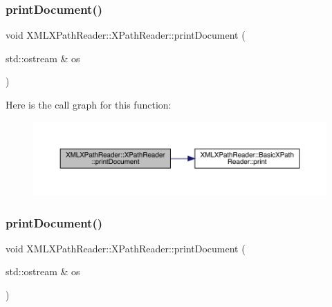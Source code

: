 \subsubsection{\texorpdfstring{printDocument()}{printDocument()}\hspace{0.1cm}{\footnotesize\ttfamily [1/2]}}
{\footnotesize\ttfamily void X\+M\+L\+X\+Path\+Reader\+::\+X\+Path\+Reader\+::print\+Document (\begin{DoxyParamCaption}\item[{std\+::ostream \&}]{os }\end{DoxyParamCaption})\hspace{0.3cm}{\ttfamily [inline]}}

Here is the call graph for this function\+:
\nopagebreak
\begin{figure}[H]
\begin{center}
\leavevmode
\includegraphics[width=350pt]{d3/d5a/classXMLXPathReader_1_1XPathReader_a5505bd1ad902828907e2562947719fef_cgraph}
\end{center}
\end{figure}
\mbox{\label{classXMLXPathReader_1_1XPathReader_a5505bd1ad902828907e2562947719fef}} 
\subsubsection{\texorpdfstring{printDocument()}{printDocument()}\hspace{0.1cm}{\footnotesize\ttfamily [2/2]}}
{\footnotesize\ttfamily void X\+M\+L\+X\+Path\+Reader\+::\+X\+Path\+Reader\+::print\+Document (\begin{DoxyParamCaption}\item[{std\+::ostream \&}]{os }\end{DoxyParamCaption})\hspace{0.3cm}{\ttfamily [inline]}}

